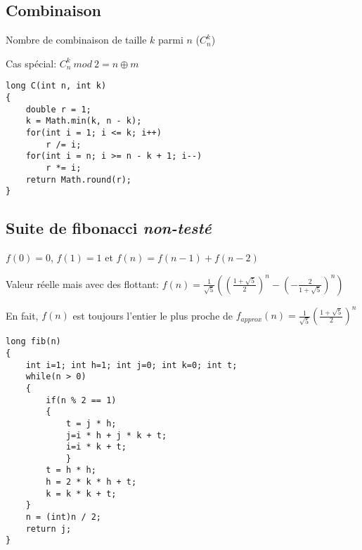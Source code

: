 \subsection{Combinaison}
Nombre de combinaison de taille $k$ parmi $n$ ($C^k_n$)

Cas spécial: $C^k_n\ mod\ 2 = n\oplus m$
\begin{lstlisting}
long C(int n, int k)
{
	double r = 1;
	k = Math.min(k, n - k);
	for(int i = 1; i <= k; i++)
		r /= i;
	for(int i = n; i >= n - k + 1; i--)
		r *= i;
	return Math.round(r);
}
\end{lstlisting}
\subsection{Suite de fibonacci {\footnotesize \textit{non-testé}}}
$f(0) = 0$, $f(1) = 1$ et $f(n) = f(n - 1) + f(n - 2)$

Valeur réelle mais avec des flottant: $f(n)=\frac{1}{\sqrt{5}}((\frac{1+\sqrt{5}}{2})^n-(-\frac{2}{1+\sqrt{5}})^n)$

En fait, $f(n)$ est toujours l'entier le plus proche de $f_{approx}(n)=\frac{1}{\sqrt{5}}(\frac{1+\sqrt{5}}{2})^n$
\begin{lstlisting}
long fib(n)
{
	int i=1; int h=1; int j=0; int k=0; int t;
	while(n > 0)
	{
		if(n % 2 == 1)
		{
			t = j * h;
			j=i * h + j * k + t; 
			i=i * k + t;
    		}
   		t = h * h;
   		h = 2 * k * h + t;
   		k = k * k + t;
	}
	n = (int)n / 2; 
	return j;
}
\end{lstlisting}
